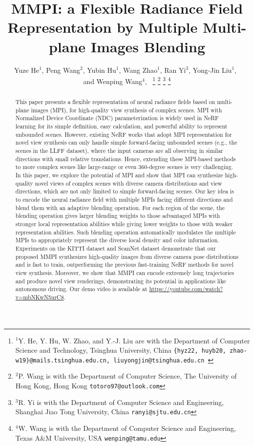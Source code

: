 \documentclass[letterpaper, 10 pt, conference]{ieeeconf}  %
\title{\LARGE \bf
MMPI: a Flexible Radiance Field Representation by Multiple Multi-plane Images Blending
}
\author{Yuze He$^{1}$, Peng Wang$^{2}$, Yubin Hu$^{1}$, Wang Zhao$^{1}$, Ran Yi$^{3}$, Yong-Jin Liu$^{1}$,~\IEEEmembership{Senior Member,~IEEE}\\and Wenping Wang$^{4}$,~\IEEEmembership{Fellow,~IEEE}%
\thanks{$^{1}$Y. He, Y. Hu, W. Zhao, and Y.-J. Liu are with the Department
of Computer Science and Technology, Tsinghua University, China
        {\tt\small \{hyz22, huyb20, zhao-w19\}@mails.tsinghua.edu.cn, liuyongjin@tsinghua.edu.cn }}%
\thanks{$^{2}$P. Wang is with the Department of Computer Science, The University of Hong Kong, Hong Kong
        {\tt\small totoro97@outlook.com}}%
\thanks{$^{3}$R. Yi is with the Department of Computer Science and Engineering, Shanghai Jiao Tong University, China
        {\tt\small ranyi@sjtu.edu.cn}}
\thanks{$^{4}$W. Wang is with the Department of Computer Science and Engineering, Texas A\&M University, USA
        {\tt\small wenping@tamu.edu}}
}
\begin{document}
\maketitle
\thispagestyle{empty}
\pagestyle{empty}


\begin{abstract}

This paper presents a flexible representation of neural radiance fields based on multi-plane images (MPI), for high-quality view synthesis of complex scenes.
MPI with Normalized Device Coordinate (NDC) parameterization is widely used in NeRF learning for its simple definition, easy calculation, and powerful ability to represent unbounded scenes.
However, existing NeRF works that adopt MPI representation for novel view synthesis can only handle simple forward-facing unbounded scenes (e.g., the scenes in the LLFF dataset), where the input cameras are all observing in similar directions with small relative translations.
Hence, extending these MPI-based methods to more complex scenes like large-range or even 360-degree scenes is very challenging.
In this paper, we explore the potential of MPI and show that MPI can synthesize high-quality novel views of complex scenes with diverse camera distributions and view directions, which are not only limited to simple forward-facing scenes.
Our key idea is to encode the neural radiance field with multiple MPIs facing different directions and blend them with an adaptive blending operation.
For each region of the scene, the blending operation gives larger blending weights to those advantaged MPIs with stronger local representation abilities while giving lower weights to those with weaker representation abilities.
Such blending operation automatically modulates the multiple MPIs to appropriately represent the diverse local density and color information.
Experiments on the KITTI dataset and ScanNet dataset demonstrate that our proposed MMPI synthesizes high-quality images from diverse camera pose distributions and is fast to train, outperforming the previous fast-training NeRF methods for novel view synthesis.
Moreover, we show that MMPI can encode extremely long trajectories and produce novel view renderings, demonstrating its potential in applications like autonomous driving. Our demo video is available at \href{https://youtube.com/watch?v=mbNKwN5urC8}{https://youtube.com/watch?v=mbNKwN5urC8}.

\end{abstract}
\end{document}
